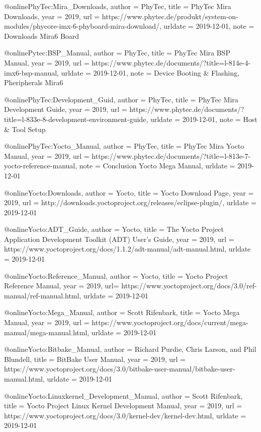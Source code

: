 @online{PhyTec:Mira_Downloads,
author = {PhyTec},
title = {{PhyTec Mira} Downloads},
year = 2019,
url = {https://www.phytec.de/produkt/system-on-modules/phycore-imx-6-phyboard-mira-download/},
urldate = {2019-12-01},
note = {Downloads Mira6 Board}
}


@online{Pytec:BSP_Manual,
author = {PhyTec},
title = {{PhyTec Mira} BSP Manual},
year = 2019,
url = {https://www.phytec.de/documents/?title=l-814e-4-imx6-bsp-manual},
urldate = {2019-12-01},
note = {Device Booting \& Flashing, Pheripherals Mira6}
}

@online{PhyTec:Development_Guid,
author = {PhyTec},
title = {{PhyTec Mira} Development Guide},
year = 2019,
url = {https://www.phytec.de/documents/?title=l-833e-8-development-environment-guide},
urldate = {2019-12-01},
note = {Host \& Tool Setup}
}


@online{PhyTec:Yocto_Manual,
author = {PhyTec},
title = {{PhyTec Mira} Yocto Manual},
year = 2019,
url = {https://www.phytec.de/documents/?title=l-813e-7-yocto-reference-manual},
note = {Conclusion Yocto Mega Manual},
urldate = {2019-12-01}
}



@online{Yocto:Downloads,
author = {Yocto},
title = {{Yocto} Download Page},
year = 2019,
url = {http://downloads.yoctoproject.org/releases/eclipse-plugin/},
urldate = {2019-12-01}
}


@online{Yocto:ADT_Guide,
author = {Yocto},
title = {The Yocto Project Application Development Toolkit (ADT) User's Guide},
year = 2019,
url = {https://www.yoctoproject.org/docs/1.1.2/adt-manual/adt-manual.html},
urldate = {2019-12-01}
}


@online{Yocto:Reference_Manual,
author = {Yocto},
title = {Yocto Project Reference Manual},
year = 2019,
url= {https://www.yoctoproject.org/docs/3.0/ref-manual/ref-manual.html},
urldate = {2019-12-01}
}


@online{Yocto:Mega_Manual,
author = {Scott Rifenbark},
title = {Yocto Mega Manual},
year = 2019,
url = {https://www.yoctoproject.org/docs/current/mega-manual/mega-manual.html},
urldate = {2019-12-01}
}


@online{Yocto:Bitbake_Manual,
author = {Richard Purdie, Chris Larson, and Phil Blundell},
title = {BitBake User Manual},
year = 2019,
url = {https://www.yoctoproject.org/docs/3.0/bitbake-user-manual/bitbake-user-manual.html},
urldate = {2019-12-01}
}

@online{Yocto:Linuxkernel_Development_Manual,
author = {Scott Rifenbark},
title = {Yocto Project Linux Kernel Development Manual},
year = 2019,
url = {https://www.yoctoproject.org/docs/3.0/kernel-dev/kernel-dev.html},
urldate = {2019-12-01}
}


